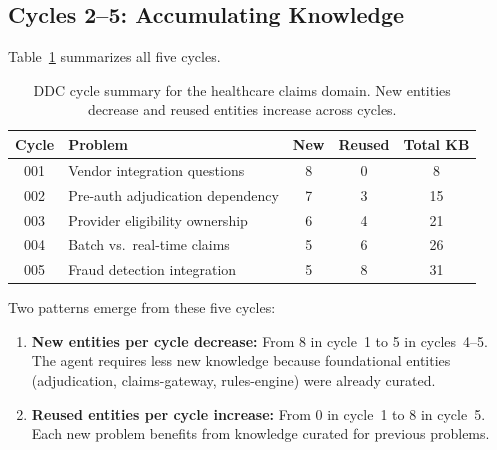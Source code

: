 \documentclass[11pt,a4paper]{article}
\begin{document}
\subsection{Cycles 2--5: Accumulating Knowledge}

Table~\ref{tab:cycles} summarizes all five cycles.

\begin{table}[h]
\centering
\caption{DDC cycle summary for the healthcare claims domain. New entities decrease and reused entities increase across cycles.}
\label{tab:cycles}
\begin{tabular}{@{}clccc@{}}
\toprule
\textbf{Cycle} & \textbf{Problem} & \textbf{New} & \textbf{Reused} & \textbf{Total KB} \\
\midrule
001 & Vendor integration questions & 8 & 0 & 8 \\
002 & Pre-auth adjudication dependency & 7 & 3 & 15 \\
003 & Provider eligibility ownership & 6 & 4 & 21 \\
004 & Batch vs.\ real-time claims & 5 & 6 & 26 \\
005 & Fraud detection integration & 5 & 8 & 31 \\
\bottomrule
\end{tabular}
\end{table}

%

Two patterns emerge from these five cycles:

\begin{enumerate}
  \item \textbf{New entities per cycle decrease:} From 8 in cycle~1 to 5 in cycles~4--5. The agent requires less new knowledge because foundational entities (adjudication, claims-gateway, rules-engine) were already curated.

  \item \textbf{Reused entities per cycle increase:} From 0 in cycle~1 to 8 in cycle~5. Each new problem benefits from knowledge curated for previous problems.
\end{enumerate}
\end{document}
